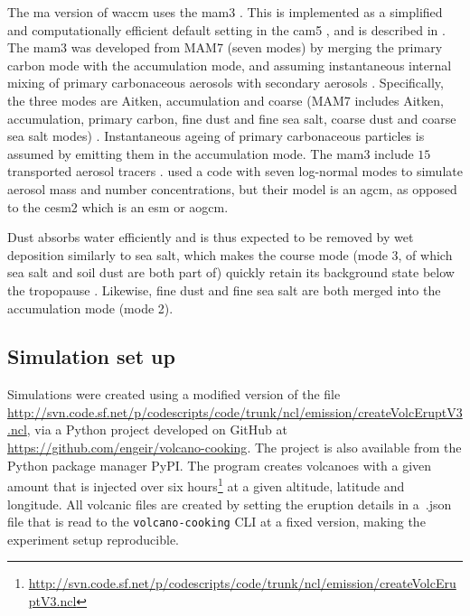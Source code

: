 \documentclass{ametsocV5}
\begin{document}
The \ac{ma} version of \ac{waccm} uses the \ac{mam3} \citep{gettleman2019}. This is
implemented as a simplified and computationally efficient default setting in the
\ac{cam5} \citep{liu2016}, and is described in \citet{liu2012}. The \ac{mam3} was
developed from MAM7 (seven modes) by merging the primary carbon mode with the
accumulation mode, and assuming instantaneous internal mixing of primary carbonaceous
aerosols with secondary aerosols \citep{liu2016}. Specifically, the three modes are
Aitken, accumulation and coarse (MAM7 includes Aitken, accumulation, primary carbon,
fine dust and fine sea salt, coarse dust and coarse sea salt modes) \citep{liu2016}.
Instantaneous ageing of primary carbonaceous particles is assumed by emitting them in
the accumulation mode. The \ac{mam3} include \(15\) transported aerosol tracers
\citep{liu2016}. \citet{marshall2019, marshall2020, marshall2021} used a code with seven
log-normal modes to simulate aerosol mass and number concentrations, but their model is
an \ac{agcm}, as opposed to the \ac{cesm2} which is an \ac{esm} or \ac{aogcm}.

Dust absorbs water efficiently and is thus expected to be removed by wet deposition
similarly to sea salt, which makes the course mode (mode 3, of which sea salt and soil
dust are both part of) quickly retain its background state below the tropopause
\citep{liu2012}. Likewise, fine dust and fine sea salt are both merged into the
accumulation mode (mode 2).


\subsection{Simulation set up}

Simulations were created using a modified version of the file
\url{http://svn.code.sf.net/p/codescripts/code/trunk/ncl/emission/createVolcEruptV3.ncl},
via a Python project developed on GitHub at
\url{https://github.com/engeir/volcano-cooking}. The project is also available from the
Python package manager PyPI\@. The program creates volcanoes with a given 
amount that is injected over six
hours\footnote{\url{http://svn.code.sf.net/p/codescripts/code/trunk/ncl/emission/createVolcEruptV3.ncl}}
at a given altitude, latitude and longitude. All volcanic  files are created by
setting the eruption details in a~.json file that is read to the
\texttt{volcano-cooking} CLI at a fixed version, making the experiment setup
reproducible.
\end{document}
